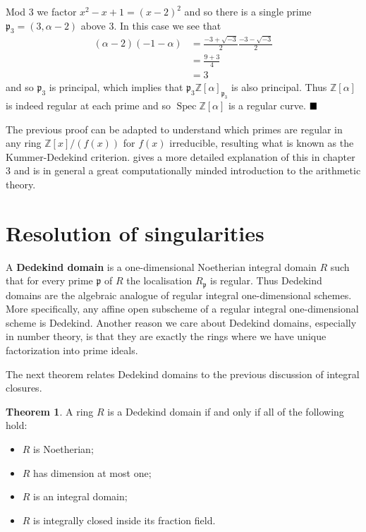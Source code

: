 \documentclass{article}
\DeclareMathOperator{\Spec}{Spec}
\newcommand{\p}{\ensuremath{\mathfrak{p}}}
\newcommand{\Z}{\ensuremath{\mathbb{Z}}}
\theoremstyle{definition}
\newcounter{dummy} \numberwithin{dummy}{section}
\newtheorem{thm}[dummy]{Theorem}
\begin{document}
Mod 3 we factor $x^2-x+1=(x-2)^2$ and so there is a single prime $\p_3 = (3, \alpha-2)$ above $3$.
In this case we see that
\begin{align*}
  (\alpha-2)(-1-\alpha)
  &= \frac{-3+\sqrt{-3}}{2} \frac{-3-\sqrt{-3}}{2}\\
  &= \frac{9 + 3}{4}\\
  &= 3
\end{align*}
and so $\p_3$ is principal, which implies that $\p_3 \Z[\alpha]_{\p_3}$ is also principal.
Thus $\Z[\alpha]$ is indeed regular at each prime and so $\Spec \Z[\alpha]$ is a regular curve.
$\hfill\blacksquare$

The previous proof can be adapted to understand which primes are regular in any ring $\Z[x]/(f(x))$ for $f(x)$ irreducible, resulting what is known as the Kummer-Dedekind criterion.
\citeauthor{stevenhagen2012number} gives a more detailed explanation of this in chapter 3 and is in general a great computationally minded introduction to the arithmetic theory.

\section{Resolution of singularities}
\label{dedekind}
A \textbf{Dedekind domain} is a one-dimensional Noetherian integral domain $R$ such that for every prime $\p$ of $R$ the localisation $R_\p$ is regular. 
Thus Dedekind domains are the algebraic analogue of regular integral one-dimensional schemes.
More specifically, any affine open subscheme of a regular integral one-dimensional scheme is Dedekind.
Another reason we care about Dedekind domains, especially in number theory, is that they are exactly the rings where we have unique factorization into prime ideals.

The next theorem relates Dedekind domains to the previous discussion of integral closures.
\begin{thm}
  \label{dedeThm}
  A ring $R$ is a Dedekind domain if and only if all of the following hold:
  \begin{itemize}
    \item $R$ is Noetherian;
    \item $R$ has dimension at most one;
    \item $R$ is an integral domain;
    \item $R$ is integrally closed inside its fraction field.
  \end{itemize}
\end{thm}
\end{document}
